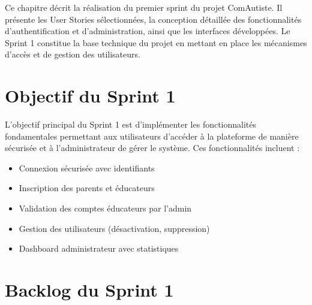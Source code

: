 \documentclass[12pt,a4paper]{report}
\begin{document}
Ce chapitre décrit la réalisation du premier sprint du projet ComAutiste. Il présente les User Stories sélectionnées, la conception détaillée des fonctionnalités d'authentification et d'administration, ainsi que les interfaces développées. Le Sprint 1 constitue la base technique du projet en mettant en place les mécanismes d'accès et de gestion des utilisateurs.

\section{Objectif du Sprint 1}

L'objectif principal du Sprint 1 est d'implémenter les fonctionnalités fondamentales permettant aux utilisateurs d'accéder à la plateforme de manière sécurisée et à l'administrateur de gérer le système. Ces fonctionnalités incluent :

\begin{itemize}
    \item Connexion sécurisée avec identifiants
    \item Inscription des parents et éducateurs
    \item Validation des comptes éducateurs par l'admin
    \item Gestion des utilisateurs (désactivation, suppression)
    \item Dashboard administrateur avec statistiques
\end{itemize}

\section{Backlog du Sprint 1}
\end{document}
